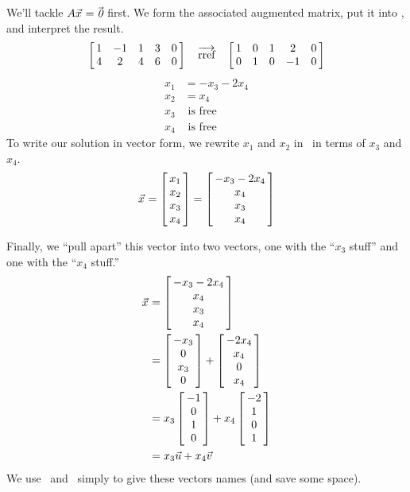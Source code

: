 {We'll tackle $\tta\vx = \zero$ first. We form the associated augmented matrix, put it into \rref, and interpret the result. $$\bmx{ccccc}1&-1&1&3&0\\4&2&4&6&0\emx \quad \arref \quad \bmx{ccccc}1&0&1&2&0\\0&1&0&-1&0\emx$$
\begin{align*} x_1&=-x_3-2x_4\\x_2 &= x_4\\ x_3&\text{ is free}\\x_4&\text{ is 
free} \end{align*} 
To write our solution in vector form, we rewrite $x_1$ and $x_2$ in \vx\ in terms of $x_3$ and $x_4$. $$\vx = \bmx{c}x_1\\x_2\\x_3\\x_4\emx = \bmx{c}-x_3-2x_4\\x_4\\x_3\\x_4\emx$$



Finally, we ``pull apart'' this vector into two vectors, one with the ``$x_3$ stuff'' and one with the ``$x_4$ stuff.''
\begin{align*}\vx &= \bmx{c}-x_3-2x_4\\x_4\\x_3\\x_4\emx\\ &= \bmx{c}-x_3\\0\\x_3\\0\emx + \bmx{c}-2x_4\\x_4\\0\\x_4\emx \\ &=x_3\bmx{c}-1\\0\\1\\0\emx + x_4\bmx{c}-2\\1\\0\\1\emx\\&=x_3\vu + x_4\vv \end{align*} We use \vu\ and \vv\ simply to give these vectors names (and save some space).

}
